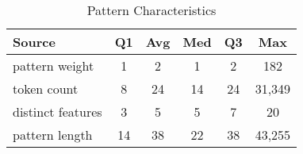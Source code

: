 \begin{table}[tb]
\begin{center}
\caption{Pattern Characteristics}
\label{table:patternStats}

\begin{tabular}{l|ccccc}
\toprule
\textbf{Source} & \textbf{Q1} & \textbf{Avg} & \textbf{Med} & \textbf{Q3} & \textbf{Max} \\
\midrule
pattern weight & 1 & 2 & 1 & 2 & 182 \\
\midrule
token count & 8 & 24 & 14 & 24 & 31,349 \\
\midrule
distinct features & 3 & 5 & 5 & 7 & 20 \\
\midrule
pattern length & 14 & 38 & 22 & 38 & 43,255 \\
\bottomrule
\end{tabular}
\end{center}
\end{table}
